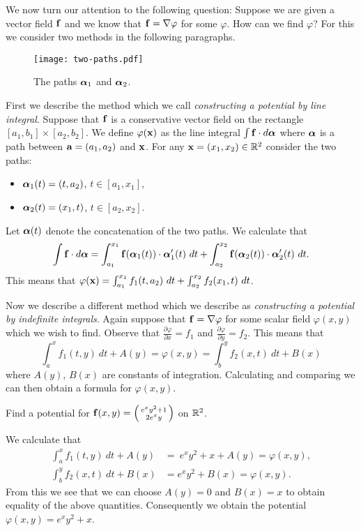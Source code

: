 We now turn our attention to the following question:
Suppose we are given a vector field \(\ff\) and we know that \(\ff = \nabla \varphi\) for some \(\varphi\).
How can we find \(\varphi\)?
For this we consider two methods in the following paragraphs.
%
\begin{figure}[tbhp]
    \centering
    \texttt{[image: two-paths.pdf]}
    \caption{The paths \(\aalpha_1\) and \(\aalpha_2\).}
\end{figure}
%
First we describe the method which we call \emph{constructing a potential by line integral}.
Suppose that \(\ff\) is a conservative vector field on the rectangle \([a_1,b_1]\times [a_2,b_2]\).
We define \(\varphi(\xx)\) as the line integral \(\int \ff \cdot d\aalpha\) where \(\aalpha\) is a path between \(\aa=(a_1,a_2)\) and \(\xx\).
For any \(\xx = (x_1,x_2) \in \bR^2\) consider the two paths:
\begin{itemize}
    \item[] \(\aalpha_1(t) = (t,a_2)\), \(t\in [a_1,x_1]\),
    \item[]  \(\aalpha_2(t) = (x_1,t)\),  \(t\in [a_2,x_2]\).
\end{itemize}
Let \(\aalpha(t)\) denote the concatenation of the two paths.
We calculate that
\[
    \int \ff \cdot d\aalpha = \int_{a_1}^{x_1} \ff(\aalpha_1(t))\cdot \aalpha_1'(t) \ dt +  \int_{a_2}^{x_2} \ff(\aalpha_2(t))\cdot \aalpha_2'(t) \ dt.
\]
This means that \(\varphi(\xx)  = \int_{a_1}^{x_1} f_1(t,a_2)\ dt + \int_{a_2}^{x_2} f_2(x_1,t)\ dt \).

Now we describe a different method which we describe as \emph{constructing a potential by indefinite integrals}.
Again suppose that \(\ff = \nabla \varphi\) for some scalar field \(\varphi(x,y)\) which we wish to find.
Observe that \(\frac{\partial \varphi}{\partial x} = f_1\) and  \(\frac{\partial \varphi}{\partial y} = f_2\).
This means that
\[
    \int_{a}^{x} f_1(t,y) \ dt + A(y) = \varphi(x,y) =  \int_{b}^{y} f_2(x,t) \ dt + B(x)
\]
where \(A(y)\), \(B(x)\) are constants of integration.
Calculating and comparing we can then obtain a formula for \(\varphi(x,y)\).

\begin{example*}
    Find a potential for \(\ff(x,y) = \left(\begin{smallmatrix}
        e^x y^2 + 1\\ 2e^x y
    \end{smallmatrix}\right)\) on \(\bR^2\).
\end{example*}
\begin{solution}
    We calculate that
    \[
        \begin{aligned}
            \int_{a}^{x} f_1(t,y) \ dt + A(y)
             & =  \ e^x y^2 + x + A(y) = \varphi(x,y), \\
            \int_{b}^{y} f_2(x,t) \ dt + B(x)
             & =  e^x y^2 + B(x) = \varphi(x,y).
        \end{aligned}
    \]
    From this we see that we can choose \(A(y) = 0\) and \(B(x)=x\) to obtain equality of the above quantities.
    Consequently we obtain the potential  \(\varphi(x,y) = e^x y^2 + x\).
\end{solution}

